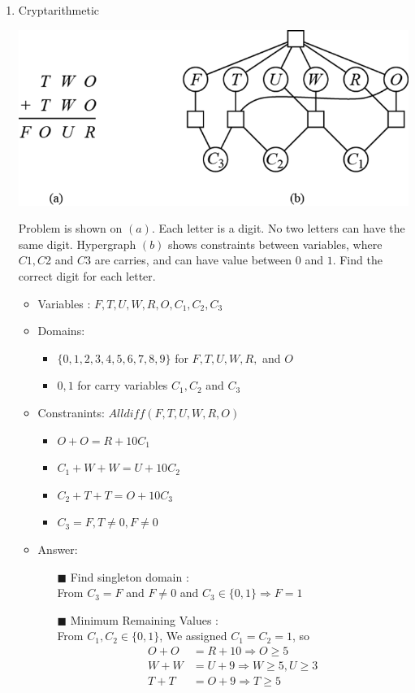 \documentclass[12pt, a4paper]{article}
\begin{document}
\begin{enumerate}
	\newpage
	\item Cryptarithmetic
	\begin{center}
		\includegraphics[scale=0.8]{Picture1.png}
	\end{center}
	Problem is shown on $(a)$. Each letter is a digit. No two letters can have the same digit. Hypergraph $(b)$ shows constraints between variables, where $C1, C$2 and $C3$ are carries, and can have value between $0$ and $1$. Find the correct digit for each letter.
	\begin{itemize}
		\item Variables : $F, T, U, W, R, O, C_1, C_2, C_3$
		
		\item Domains:
		\begin{itemize}
			\item $\{0,1,2,3,4,5,6,7,8,9\}$ for $F, T, U, W, R,$ and $O$
			\item ${0, 1}$ for carry variables $C_1, C_2$ and $C_3$
		\end{itemize}
		\item Constranints: $Alldiff (F,T,U,W,R,O)$
		\begin{itemize}
			\item $O + O = R + 10C_1$
			\item $C_1 + W + W = U + 10C_2$
			\item $C_2 + T + T = O + 10 C_3$
			\item $C_3 = F, T \not = 0, F\not = 0$
		\end{itemize}
	 \item Answer:
	 \begin{itemize}
	 	\item[$\blacksquare$] Find singleton domain :\\
	 	From $C_3 = F$ and $F \not = 0$ and $C_3 \in \{0,1\} \Rightarrow F = 1$
	 	
	 	\item[$\blacksquare$] Minimum Remaining Values :\\
	 	From $C_1, C_2 \in \{0,1\}$, We assigned $C_1 = C_2 = 1$, so
	 	\begin{align*}
	 		O + O &= R + 10 \Rightarrow O \geq 5 \\
	 		W + W &= U + 9 \Rightarrow W \geq 5, U \geq 3\\
	 		T + T &= O + 9 \Rightarrow T \geq 5
	 	\end{align*} 
 	

\end{itemize}
\end{itemize}
\end{enumerate}
\end{document}
